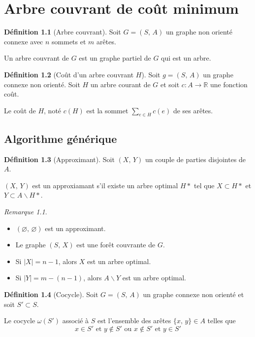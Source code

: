\documentclass[11pt,english,french]{scrreprt}
\theoremstyle{remark}
\newtheorem*{rem*}{Remarque}
\theoremstyle{definition}
\newtheorem*{def*}{Définition}
\begin{document}
\chapter{Arbre couvrant de coût minimum} %

\begin{def*}[Arbre couvrant]
	Soit $G=(S,\,A)$ un graphe non orienté connexe avec $n$ sommets et $m$ arêtes.
	
	Un arbre couvrant de $G$ est un graphe partiel de $G$ qui est un arbre.
\end{def*}

\begin{def*}[Coût d'un arbre couvrant $H$]
	Soit $g=(S,\,A)$ un graphe connexe non orienté.
	Soit $H$ un arbre courant de $G$ et soit $c\colon A\longrightarrow \mathbb{R}$ une fonction coût.
	
	Le coût de $H$, noté $c(H)$ est la sommet $\sum_{e\in H}c(e)$ de ses arêtes.
\end{def*}

\section{Algorithme générique} %

\begin{def*}[Approximant]
	Soit $(X,\,Y)$ un couple de parties disjointes de $A$.
	
	$(X,\,Y)$ est un approxiamant s'il existe un arbre optimal $H*$ tel que $X\subset H*$ et $Y\subset A\backslash H*$.
\end{def*}

\begin{rem*}
	\hfill \begin{itemize}
		\item $(\varnothing,\,\varnothing)$ est un approximant.
		\item Le graphe $(S,\,X)$ est une forêt couvrante de $G$.
		\item Si $|X|=n-1$, alors $X$ est un arbre optimal.
		\item Si $|Y|=m-(n-1)$, alors $A\backslash Y$ est un arbre optimal.
	\end{itemize}
\end{rem*}

\begin{def*}[Cocycle]
	Soit $G=(S,\,A)$ un graphe connexe non orienté et soit $S'\subset S$.
	
	Le cocycle $\omega(S')$ associé à $S$ est l'ensemble des arêtes $\{x,\,y\}\in A$ telles que 
	\[
		x\in S'\textrm{ et }y\notin S'\textrm{ ou }x\notin S'\textrm{ et }y\in S'
	\]
\end{def*}
\end{document}
